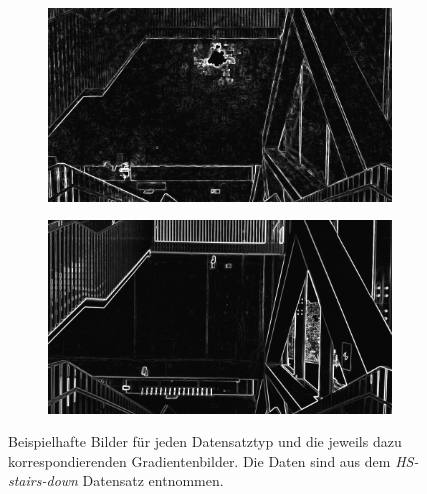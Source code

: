 \begin{figure}
\begin{subfigure}[t]{0.24\linewidth}
		\caption{}
	\end{subfigure}
	\hfill
	\begin{subfigure}[t]{0.24\linewidth}
		\centering
		\includegraphics[width=\linewidth]{images/syn_dataset/cg00188.png}
		\caption{}
	\end{subfigure}
	\hfill
	\begin{subfigure}[t]{0.24\linewidth}
		\centering
		\includegraphics[width=\linewidth]{images/syn_dataset/rg000089.png}
		\caption{}
	\end{subfigure}
	\hfill
	\caption{Beispielhafte Bilder für jeden Datensatztyp und die jeweils dazu korrespondierenden Gradientenbilder. Die Daten sind aus dem \textit{HS-stairs-down} Datensatz entnommen.}
	\label{fig:dataset_preprocess}
\end{figure}

